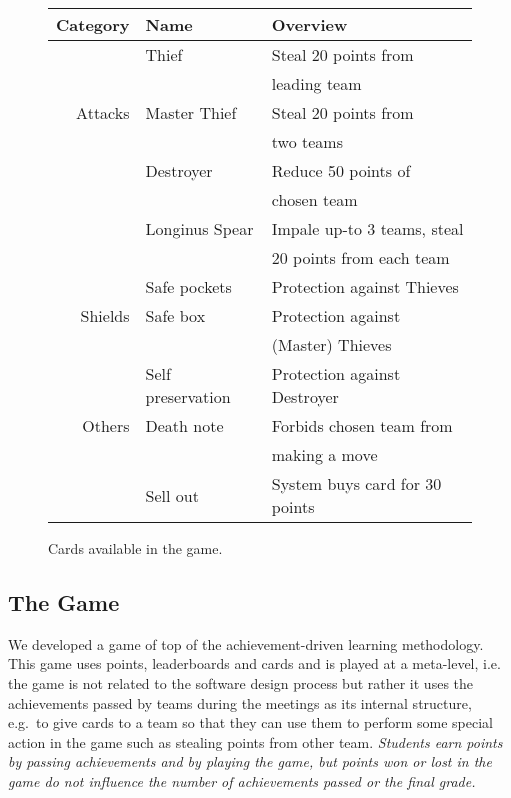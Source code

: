 \documentclass[
]{article}
\begin{document}
\begin{figure}[t]
\begin{tabular}{|r|l|l|}
\hline
Category & Name & Overview \\
\hline
& Thief & Steal 20 points from \\
&& leading team \\ \cline{2-3}
Attacks & Master Thief & Steal 20 points from \\
&& two teams \\ \cline{2-3}
& Destroyer & Reduce 50 points of \\
&& chosen team \\ \cline{2-3}
& Longinus Spear & Impale up-to 3 teams, steal \\
&&20 points from each team \\ \cline{2-3}
\hline
& Safe pockets & Protection against Thieves  \\ \cline{2-3}
Shields & Safe box & Protection against \\
&& (Master) Thieves \\ \cline{2-3}
& Self preservation & Protection against Destroyer  \\ \cline{2-3}
\hline
Others & Death note & Forbids chosen team from \\
&& making a move\\ \cline{2-3}
& Sell out & System buys card for 30 points \\ \cline{2-3}
\hline
\end{tabular}
\caption{\label{fig:available-cards}Cards available in the game.}
\end{figure}

\hypertarget{sec:the-game}{%
\subsection{The Game}\label{sec:the-game}}

We developed a game of top of the achievement-driven learning
methodology. This game uses points, leaderboards and cards and is played
at a meta-level, i.e. the game is not related to the software design
process but rather it uses the achievements passed by teams during the
meetings as its internal structure, e.g.~to give cards to a team so that
they can use them to perform some special action in the game such as
stealing points from other team.
\textit{Students earn points by passing achievements and by playing the game, but
points won or lost in the game do not influence the number of achievements passed or the final grade.}
\end{document}
